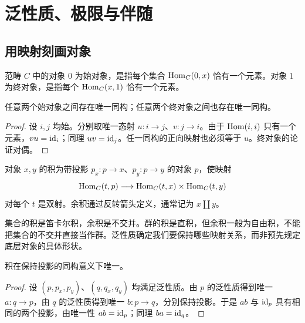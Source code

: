 \chapter{泛性质、极限与伴随}
\section{用映射刻画对象}
\begin{definition}[始对象与终对象]
范畴 $C$ 中的对象 $0$ 为始对象，是指每个集合 $\operatorname{Hom}_C(0,x)$ 恰有一个元素。对象 $1$ 为终对象，是指每个 $\operatorname{Hom}_C(x,1)$ 恰有一个元素。
\end{definition}
\begin{lemma}[泛对象的唯一性]
任意两个始对象之间存在唯一同构；任意两个终对象之间也存在唯一同构。
\end{lemma}
\begin{proof}
设 $i,j$ 均始。分别取唯一态射 $u:i\to j$、$v:j\to i$。由于 $\operatorname{Hom}(i,i)$ 只有一个元素，$vu=\operatorname{id}_i$；同理 $uv=\operatorname{id}_j$。任一同构的正向映射也必须等于 $u$。终对象的论证对偶。
\end{proof}
\begin{definition}[积与余积]
对象 $x,y$ 的积为带投影 $p_x:p\to x$、$p_y:p\to y$ 的对象 $p$，使映射
\[
\operatorname{Hom}_C(t,p)\longrightarrow\operatorname{Hom}_C(t,x)\times\operatorname{Hom}_C(t,y)
\]
对每个 $t$ 是双射。余积通过反转箭头定义，通常记为 $x\amalg y$。
\end{definition}
\begin{example}
集合的积是笛卡尔积，余积是不交并。群的积是直积，但余积一般为自由积，不能把集合的不交并直接当作群。泛性质确定我们要保持哪些映射关系，而非预先规定底层对象的具体形状。
\end{example}
\begin{proposition}
积在保持投影的同构意义下唯一。
\end{proposition}
\begin{proof}
设 $(p,p_x,p_y)$、$(q,q_x,q_y)$ 均满足泛性质。由 $p$ 的泛性质得到唯一 $a:q\to p$，由 $q$ 的泛性质得到唯一 $b:p\to q$，分别保持投影。于是 $ab$ 与 $\operatorname{id}_p$ 具有相同的两个投影，由唯一性 $ab=\operatorname{id}_p$；同理 $ba=\operatorname{id}_q$。
\end{proof}

